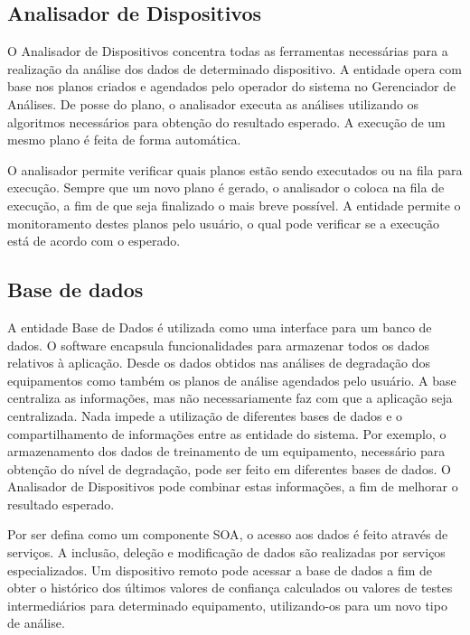 \subsection{Analisador de Dispositivos}
\label{sub:proposta-analisador-dispositivos}

O Analisador de Dispositivos concentra todas as ferramentas necessárias para a realização da análise
dos dados de determinado dispositivo. A entidade opera com base nos planos criados e agendados pelo
operador do sistema no Gerenciador de Análises. De posse do plano, o analisador executa as análises
utilizando os algoritmos necessários para obtenção do resultado esperado. A execução de um mesmo
plano é feita de forma automática.

O analisador permite verificar quais planos estão sendo executados ou na fila para execução. Sempre
que um novo plano é gerado, o analisador o coloca na fila de execução, a fim de que seja
finalizado o mais breve possível. A entidade permite o monitoramento destes planos pelo usuário, o
qual pode verificar se a execução está de acordo com o esperado.


\subsection{Base de dados}
\label{sub:proposta-base-dados}

A entidade Base de Dados é utilizada como uma interface para um banco de dados. O software encapsula
funcionalidades para  armazenar todos os dados relativos à aplicação. Desde os dados obtidos nas
análises de degradação dos equipamentos como também os planos de análise agendados pelo usuário. A
base centraliza as informações, mas não necessariamente faz com que a aplicação seja centralizada.
Nada impede a utilização de diferentes bases de dados e o compartilhamento de informações entre as
entidade do sistema. Por exemplo, o armazenamento dos dados de treinamento de um equipamento,
necessário para obtenção do nível de degradação, pode ser feito em diferentes bases de dados. O
Analisador de Dispositivos pode combinar estas informações, a fim de melhorar o resultado esperado.

Por ser defina como um componente \gls{SOA}, o acesso aos dados é feito através de serviços. A
inclusão, deleção e modificação de dados são realizadas por serviços especializados. Um dispositivo
remoto pode acessar a base de dados a fim de obter o histórico dos últimos valores de confiança
calculados ou valores de testes intermediários para determinado equipamento, utilizando-os para um
novo tipo de análise.


